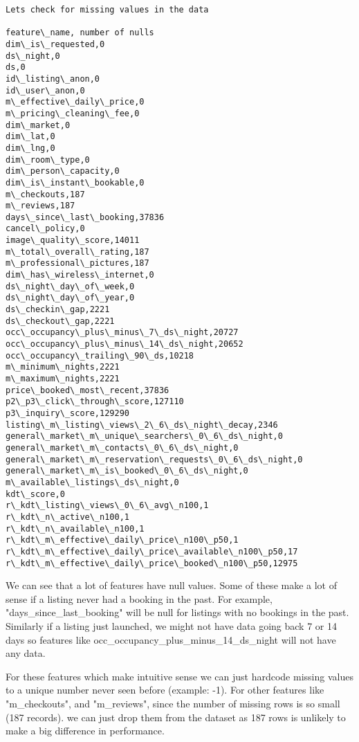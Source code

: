 \documentclass[11pt]{article}
\begin{document}
    \begin{Verbatim}[commandchars=\\\{\}]
Lets check for missing values in the data

feature\_name, number of nulls
dim\_is\_requested,0
ds\_night,0
ds,0
id\_listing\_anon,0
id\_user\_anon,0
m\_effective\_daily\_price,0
m\_pricing\_cleaning\_fee,0
dim\_market,0
dim\_lat,0
dim\_lng,0
dim\_room\_type,0
dim\_person\_capacity,0
dim\_is\_instant\_bookable,0
m\_checkouts,187
m\_reviews,187
days\_since\_last\_booking,37836
cancel\_policy,0
image\_quality\_score,14011
m\_total\_overall\_rating,187
m\_professional\_pictures,187
dim\_has\_wireless\_internet,0
ds\_night\_day\_of\_week,0
ds\_night\_day\_of\_year,0
ds\_checkin\_gap,2221
ds\_checkout\_gap,2221
occ\_occupancy\_plus\_minus\_7\_ds\_night,20727
occ\_occupancy\_plus\_minus\_14\_ds\_night,20652
occ\_occupancy\_trailing\_90\_ds,10218
m\_minimum\_nights,2221
m\_maximum\_nights,2221
price\_booked\_most\_recent,37836
p2\_p3\_click\_through\_score,127110
p3\_inquiry\_score,129290
listing\_m\_listing\_views\_2\_6\_ds\_night\_decay,2346
general\_market\_m\_unique\_searchers\_0\_6\_ds\_night,0
general\_market\_m\_contacts\_0\_6\_ds\_night,0
general\_market\_m\_reservation\_requests\_0\_6\_ds\_night,0
general\_market\_m\_is\_booked\_0\_6\_ds\_night,0
m\_available\_listings\_ds\_night,0
kdt\_score,0
r\_kdt\_listing\_views\_0\_6\_avg\_n100,1
r\_kdt\_n\_active\_n100,1
r\_kdt\_n\_available\_n100,1
r\_kdt\_m\_effective\_daily\_price\_n100\_p50,1
r\_kdt\_m\_effective\_daily\_price\_available\_n100\_p50,17
r\_kdt\_m\_effective\_daily\_price\_booked\_n100\_p50,12975

    \end{Verbatim}

    We can see that a lot of features have null values. Some of these make a
lot of sense if a listing never had a booking in the past. For example,
"days\_since\_last\_booking" will be null for listings with no bookings
in the past. Similarly if a listing just launched, we might not have
data going back 7 or 14 days so features like
occ\_occupancy\_plus\_minus\_14\_ds\_night will not have any data.

For these features which make intuitive sense we can just hardcode
missing values to a unique number never seen before (example: -1). For
other features like "m\_checkouts", and "m\_reviews", since the number
of missing rows is so small (187 records). we can just drop them from
the dataset as 187 rows is unlikely to make a big difference in
performance.
\end{document}

